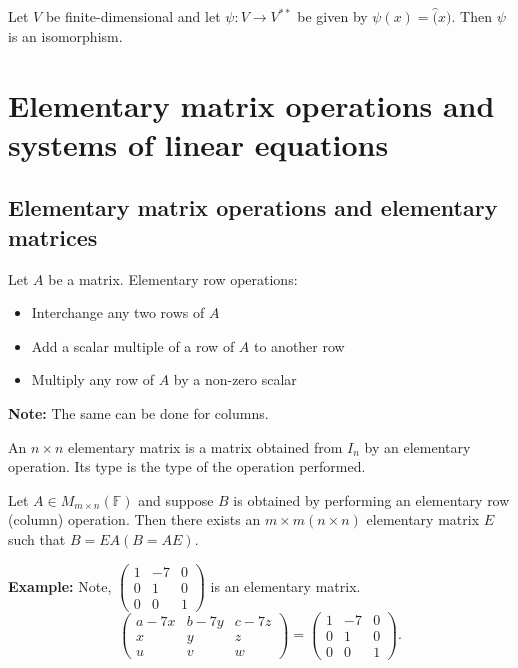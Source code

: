 \documentclass[12pt]{article}
\newenvironment{theorem}[2][Theorem]{\begin{trivlist}
\item[\hskip \labelsep {\bfseries #1}\hskip \labelsep {\bfseries #2.}]}{\end{trivlist}}
\newenvironment{definition}[2][Definition]{\begin{trivlist}
\item[\hskip \labelsep {\bfseries #1}\hskip \labelsep {\bfseries #2}]}{\end{trivlist}}
\begin{document}
\begin{theorem}{2.26}
Let $V$ be finite-dimensional and let $\psi : V \to V^{**}$ be given by $\psi(x) = \hat(x)$. Then $\psi$ is an isomorphism.
\end{theorem}

\section{Elementary matrix operations and systems of linear equations}

\subsection{Elementary matrix operations and elementary matrices}

\begin{definition}{1}
Let $A$ be a matrix. Elementary row operations:

\begin{itemize}
    \item Interchange any two rows of $A$
    
    \item Add a scalar multiple of a row of $A$ to another row
    
    \item Multiply any row of $A$ by a non-zero scalar
\end{itemize}
\end{definition}

\noindent \textbf{Note:} The same can be done for columns.

\begin{definition}{2}
An $n \times n$ elementary matrix is a matrix obtained from $I_n$ by an elementary operation. Its type is the type of the operation performed.
\end{definition}

\begin{theorem}{3.1}
Let $A \in M_{m \times n}(\mathbb{F})$ and suppose $B$ is obtained by performing an elementary row (column) operation. Then there exists an $m \times m (n \times n)$ elementary matrix $E$ such that $B = EA (B = AE)$.
\end{theorem}

\noindent\textbf{Example:} \text{ }
Note, $\begin{pmatrix}
1 & -7 & 0 \\ 0 & 1 & 0 \\ 0 & 0 & 1
\end{pmatrix}$ is an elementary matrix. $$\begin{pmatrix}
a-7x & b-7y & c-7z \\ x & y & z \\ u & v & w
\end{pmatrix} = \begin{pmatrix}
1 & -7 & 0 \\ 0 & 1 & 0 \\ 0 & 0 & 1
\end{pmatrix}.$$
\end{document}
